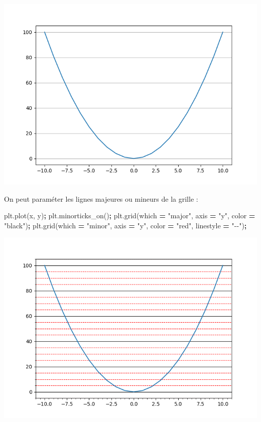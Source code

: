 \documentclass[
  12pt,
]{book}
\newenvironment{Shaded}{\begin{snugshade}}{\end{snugshade}}
\newcommand{\NormalTok}[1]{#1}
\newcommand{\OperatorTok}[1]{\textcolor[rgb]{0.81,0.36,0.00}{\textbf{#1}}}
\newcommand{\StringTok}[1]{\textcolor[rgb]{0.31,0.60,0.02}{#1}}
\numberwithin{equation}{section}
\numberwithin{countremarque}{section}
\begin{document}
\begin{center}\includegraphics[width=9.03in]{figs/pyplot/plot_grid_y} \end{center}

On peut paraméter les lignes majeures ou mineurs de la grille :

\begin{Shaded}
\begin{Highlighting}[]
\NormalTok{plt.plot(x, y)}\OperatorTok{;}
\NormalTok{plt.minorticks\_on()}\OperatorTok{;}
\NormalTok{plt.grid(which }\OperatorTok{=} \StringTok{"major"}\NormalTok{, axis }\OperatorTok{=} \StringTok{"y"}\NormalTok{, color }\OperatorTok{=} \StringTok{"black"}\NormalTok{)}\OperatorTok{;}
\NormalTok{plt.grid(which }\OperatorTok{=} \StringTok{"minor"}\NormalTok{, axis }\OperatorTok{=} \StringTok{"y"}\NormalTok{, color }\OperatorTok{=} \StringTok{"red"}\NormalTok{, linestyle }\OperatorTok{=} \StringTok{"{-}{-}"}\NormalTok{)}\OperatorTok{;}
\end{Highlighting}
\end{Shaded}

\begin{center}\includegraphics[width=9.03in]{figs/pyplot/plot_grid_minor} \end{center}
\end{document}
